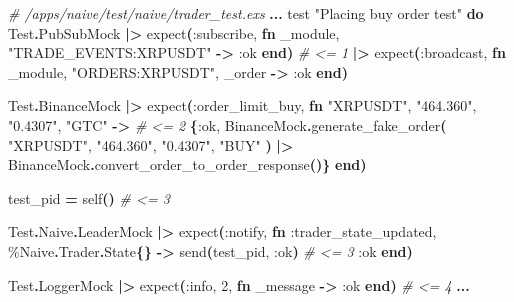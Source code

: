 \documentclass[
  oneside]{book}
\newenvironment{Shaded}{\begin{snugshade}}{\end{snugshade}}
\newcommand{\CommentTok}[1]{\textcolor[rgb]{0.56,0.35,0.01}{\textit{#1}}}
\newcommand{\ConstantTok}[1]{\textcolor[rgb]{0.56,0.35,0.01}{#1}}
\newcommand{\DecValTok}[1]{\textcolor[rgb]{0.00,0.00,0.81}{#1}}
\newcommand{\FunctionTok}[1]{\textcolor[rgb]{0.13,0.29,0.53}{\textbf{#1}}}
\newcommand{\KeywordTok}[1]{\textcolor[rgb]{0.13,0.29,0.53}{\textbf{#1}}}
\newcommand{\NormalTok}[1]{#1}
\newcommand{\OperatorTok}[1]{\textcolor[rgb]{0.81,0.36,0.00}{\textbf{#1}}}
\newcommand{\StringTok}[1]{\textcolor[rgb]{0.31,0.60,0.02}{#1}}
\newcommand{\VariableTok}[1]{\textcolor[rgb]{0.00,0.00,0.00}{#1}}
\begin{document}
\begin{Shaded}
\begin{Highlighting}[]
\CommentTok{\# /apps/naive/test/naive/trader\_test.exs}
  \OperatorTok{...}
\NormalTok{  test }\StringTok{"Placing buy order test"} \KeywordTok{do}
    \ConstantTok{Test}\OperatorTok{.}\ConstantTok{PubSubMock}
    \OperatorTok{|\textgreater{}}\NormalTok{ expect}\FunctionTok{(}\VariableTok{:subscribe}\NormalTok{, }\KeywordTok{fn}\NormalTok{ \_module, }\StringTok{"TRADE\_EVENTS:XRPUSDT"} \OperatorTok{{-}\textgreater{}} \VariableTok{:ok} \KeywordTok{end}\FunctionTok{)} \CommentTok{\# \textless{}= 1}
    \OperatorTok{|\textgreater{}}\NormalTok{ expect}\FunctionTok{(}\VariableTok{:broadcast}\NormalTok{, }\KeywordTok{fn}\NormalTok{ \_module, }\StringTok{"ORDERS:XRPUSDT"}\NormalTok{, \_order }\OperatorTok{{-}\textgreater{}} \VariableTok{:ok} \KeywordTok{end}\FunctionTok{)}

    \ConstantTok{Test}\OperatorTok{.}\ConstantTok{BinanceMock}
    \OperatorTok{|\textgreater{}}\NormalTok{ expect}\FunctionTok{(}\VariableTok{:order\_limit\_buy}\NormalTok{, }\KeywordTok{fn} \StringTok{"XRPUSDT"}\NormalTok{, }\StringTok{"464.360"}\NormalTok{, }\StringTok{"0.4307"}\NormalTok{, }\StringTok{"GTC"} \OperatorTok{{-}\textgreater{}} \CommentTok{\# \textless{}= 2}
      \FunctionTok{\{}\VariableTok{:ok}\NormalTok{,}
       \ConstantTok{BinanceMock}\OperatorTok{.}\NormalTok{generate\_fake\_order}\FunctionTok{(}
         \StringTok{"XRPUSDT"}\NormalTok{,}
         \StringTok{"464.360"}\NormalTok{,}
         \StringTok{"0.4307"}\NormalTok{,}
         \StringTok{"BUY"}
       \FunctionTok{)}
       \OperatorTok{|\textgreater{}} \ConstantTok{BinanceMock}\OperatorTok{.}\NormalTok{convert\_order\_to\_order\_response}\FunctionTok{()\}}
    \KeywordTok{end}\FunctionTok{)}

\NormalTok{    test\_pid }\OperatorTok{=}\NormalTok{ self}\FunctionTok{()} \CommentTok{\# \textless{}= 3}

    \ConstantTok{Test}\OperatorTok{.}\ConstantTok{Naive}\OperatorTok{.}\ConstantTok{LeaderMock}
    \OperatorTok{|\textgreater{}}\NormalTok{ expect}\FunctionTok{(}\VariableTok{:notify}\NormalTok{, }\KeywordTok{fn} \VariableTok{:trader\_state\_updated}\NormalTok{, \%}\ConstantTok{Naive}\OperatorTok{.}\ConstantTok{Trader}\OperatorTok{.}\ConstantTok{State}\FunctionTok{\{\}} \OperatorTok{{-}\textgreater{}}
\NormalTok{      send}\FunctionTok{(}\NormalTok{test\_pid, }\VariableTok{:ok}\FunctionTok{)} \CommentTok{\# \textless{}= 3}
      \VariableTok{:ok}
    \KeywordTok{end}\FunctionTok{)}

    \ConstantTok{Test}\OperatorTok{.}\ConstantTok{LoggerMock}
    \OperatorTok{|\textgreater{}}\NormalTok{ expect}\FunctionTok{(}\VariableTok{:info}\NormalTok{, }\DecValTok{2}\NormalTok{, }\KeywordTok{fn}\NormalTok{ \_message }\OperatorTok{{-}\textgreater{}} \VariableTok{:ok} \KeywordTok{end}\FunctionTok{)} \CommentTok{\# \textless{}= 4}
    \OperatorTok{...}
\end{Highlighting}
\end{Shaded}
\end{document}
